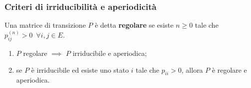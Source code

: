 \subsubsection{Criteri di irriducibilità e aperiodicità}
\begin{defn}
	Una matrice di transizione $P$ è detta \textbf{regolare} se esiste $n \ge 0$ tale che $p_{ij}^{(n)}>0 \enspace \forall i,j \in E$.
\end{defn}

\begin{prop}
	\Fixvmode
	\begin{enumerate}
		\item $P$ regolare $\implies$ $P$ irriducibile e aperiodica;
		\item se $P$ è irriducibile ed esiste uno stato $i$ tale che $p_{ii} > 0$, allora $P$ è regolare e aperiodica.
	\end{enumerate}
\end{prop}

